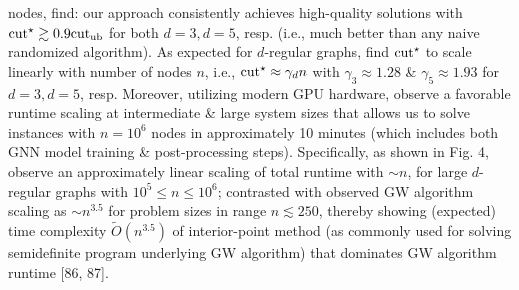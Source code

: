 \documentclass{article}
\begin{document}
\begin{itemize}
nodes, find: our approach consistently achieves high-quality solutions with ${\rm cut}^\star\gtrsim0.9{\rm cut}_{\rm ub}$ for both $d = 3,d = 5$, resp. (i.e., much better than any naive randomized algorithm). As expected for $d$-regular graphs, find ${\rm cut}^\star$ to scale linearly with number of nodes $n$, i.e., ${\rm cut}^\star\approx\gamma_dn$ with $\gamma_3\approx1.28$ \& $\gamma_5\approx1.93$ for $d = 3,d = 5$, resp. Moreover, utilizing modern GPU hardware, observe a favorable runtime scaling at intermediate \& large system sizes that allows us to solve instances with $n = 10^6$ nodes in approximately 10 minutes (which includes both GNN model training \& post-processing steps). Specifically, as shown in {\sf Fig. 4}, observe an approximately linear scaling of total runtime with $\sim n$, for large $d$-regular graphs with $10^5\le n\le10^6$; contrasted with observed GW algorithm scaling as $\sim n^{3.5}$ for problem sizes in range $n\lesssim250$, thereby showing (expected) time complexity $\tilde{O}(n^{3.5})$ of interior-point method (as commonly used for solving semidefinite program underlying GW algorithm) that dominates GW algorithm runtime [86, 87].


\end{itemize}
\end{document}

